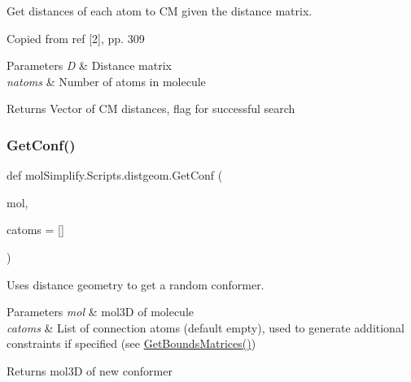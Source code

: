 Get distances of each atom to CM given the distance matrix. 

Copied from ref \mbox{[}2\mbox{]}, pp. 309 
\begin{DoxyParams}{Parameters}
{\em D} & Distance matrix \\
\hline
{\em natoms} & Number of atoms in molecule \\
\hline
\end{DoxyParams}
\begin{DoxyReturn}{Returns}
Vector of CM distances, flag for successful search 
\end{DoxyReturn}
\mbox{\label{namespacemolSimplify_1_1Scripts_1_1distgeom_ab4b658be4a3b69023b662b3268e73f66}} 
\subsubsection{\texorpdfstring{Get\+Conf()}{GetConf()}}
{\footnotesize\ttfamily def mol\+Simplify.\+Scripts.\+distgeom.\+Get\+Conf (\begin{DoxyParamCaption}\item[{}]{mol,  }\item[{}]{catoms = {\ttfamily \mbox{[}\mbox{]}} }\end{DoxyParamCaption})}



Uses distance geometry to get a random conformer. 


\begin{DoxyParams}{Parameters}
{\em mol} & mol3D of molecule \\
\hline
{\em catoms} & List of connection atoms (default empty), used to generate additional constraints if specified (see \hyperlink{namespacemolSimplify_1_1Scripts_1_1distgeom_a511e618a1e62d7d1ad97e26692c62a42}{Get\+Bounds\+Matrices()}) \\
\hline
\end{DoxyParams}
\begin{DoxyReturn}{Returns}
mol3D of new conformer 
\end{DoxyReturn}
\mbox{\label{namespacemolSimplify_1_1Scripts_1_1distgeom_a4cab2a5d58e3b87a21782fe674644556}} 
